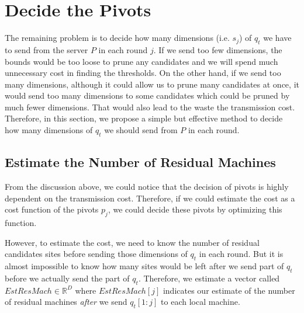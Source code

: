 


\section{Decide the Pivots} %
\label{s:decide_the_pivots}

The remaining problem is to decide how many dimensions (i.e. $s_j$) of $q_t$ we have to send from the server $P$ in each round $j$.  If we send too few dimensions, the bounds would be too loose to prune any candidates and we will spend much unnecessary cost in finding the thresholds.  On the other hand, if we send too many dimensions, although it could allow us to prune many candidates at once, it would send too many dimensions to some candidates which could be pruned by much fewer dimensions.  That would also lead to the waste the transmission cost.  Therefore, in this section, we propose a simple but effective method to decide how many dimensions of $q_t$ we should send from $P$ in each round.


\subsection{Estimate the Number of Residual Machines} %
\label{ss:estimate_the_number_of_residual_machines}

From the discussion above, we could notice that the decision of pivots is highly dependent on the transmission cost.  Therefore, if we could estimate the cost as a cost function of the pivots $p_j$, we could decide these pivots by optimizing this function.

However, to estimate the cost, we need to know the number of residual candidates sites before sending those dimensions of $q_t$ in each round.  But it is almost impossible to know how many sites would be left after we send part of $q_t$ before we actually send the part of $q_t$.  Therefore, we estimate a vector called $EstResMach \in\mathbb{R}^D$ where $EstResMach[j]$ indicates our estimate of the number of residual machines \emph{after} we send $q_t[1:j]$ to each local machine.  

